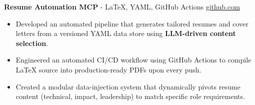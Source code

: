 \documentclass[11pt]{article}       %
\begin{document}

\textbf{Resume Automation MCP}{ - LaTeX, YAML, GitHub Actions} \hfill \href{https://github.com/Monica20030707/Tex_OrangeLeaf-mcp}{github.com} \\
\vspace{-9pt}
\begin{itemize}
  \item Developed an automated pipeline that generates tailored resumes and cover letters from a versioned YAML data store using \textbf{LLM-driven content selection}.
  \item Engineered an automated CI/CD workflow using GitHub Actions to compile LaTeX source into production-ready PDFs upon every push.
  \item Created a modular data-injection system that dynamically pivots resume content (technical, impact, leadership) to match specific role requirements.
\end{itemize}
\end{document}
